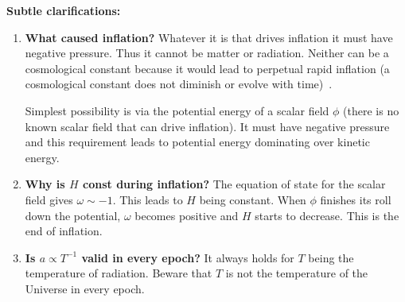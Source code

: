 \begin{mycolorbox}
      \textbf{Subtle clarifications:}
  
\begin{enumerate}
      \item \textbf{What caused inflation?}
             Whatever it is that drives inflation it must have negative pressure. Thus it cannot be matter or radiation.
             Neither can be a cosmological constant because it would lead to perpetual rapid inflation (a cosmological constant does not diminish or evolve with time)~\cite{ModernCosm}.
  
             Simplest possibility is via the potential energy of a scalar field $\phi$ (there
             is no known scalar field that can drive inflation). It must have negative pressure and this requirement leads to potential energy dominating over kinetic energy.
      \item \textbf{Why is $H$ const during inflation?} The equation of state for the scalar field gives $\omega \sim -1$. This leads to $H$ being constant. When $\phi$ finishes its roll down the potential, $\omega$ becomes positive and $H$ starts to decrease. This is the end of inflation.
      \item \textbf{Is $a \propto T^{-1}$ valid in every epoch?} It always holds for $T$ being the temperature of radiation. Beware that $T$ is not the temperature of the Universe in every epoch.
  \end{enumerate}
\end{mycolorbox}
\begin{figure}[h]
      \centering
  \end{figure}
